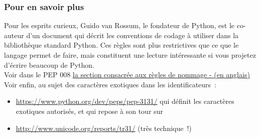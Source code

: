     \hypertarget{pour-en-savoir-plus}{%
\subsubsection{Pour en savoir plus}\label{pour-en-savoir-plus}}

    Pour les esprits curieux, Guido van Rossum, le fondateur de Python, est
le co-auteur d'un document qui décrit les conventions de codage à
utiliser dans la bibliothèque standard Python. Ces règles sont plus
restrictives que ce que le langage permet de faire, mais constituent une
lecture intéressante si vous projetez d'écrire beaucoup de Python.\\

Voir dans le PEP 008
\href{http://legacy.python.org/dev/peps/pep-0008/\#descriptive-naming-styles}{la
section consacrée aux règles de nommage - (en anglais)}\\

    Voir enfin, au sujet des caractères exotiques dans les identificateurs~:

\begin{itemize}
\tightlist
\item
  \href{https://www.python.org/dev/peps/pep-3131/}{https://www.python.org/dev/peps/pep-3131/} qui définit les caractères
  exotiques autorisés, et qui repose à son tour sur
\item
  \href{http://www.unicode.org/reports/tr31/}{http://www.unicode.org/reports/tr31/} (très technique~!)
\end{itemize}